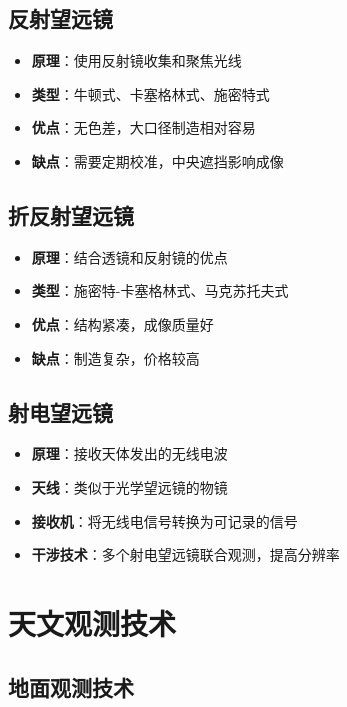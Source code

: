 \documentclass[12pt,UTF8]{ctexbook}
\begin{document}
\subsection{反射望远镜}

\begin{itemize}
  \item \textbf{原理}：使用反射镜收集和聚焦光线
  \item \textbf{类型}：牛顿式、卡塞格林式、施密特式
  \item \textbf{优点}：无色差，大口径制造相对容易
  \item \textbf{缺点}：需要定期校准，中央遮挡影响成像
\end{itemize}

\subsection{折反射望远镜}

\begin{itemize}
  \item \textbf{原理}：结合透镜和反射镜的优点
  \item \textbf{类型}：施密特-卡塞格林式、马克苏托夫式
  \item \textbf{优点}：结构紧凑，成像质量好
  \item \textbf{缺点}：制造复杂，价格较高
\end{itemize}

\subsection{射电望远镜}

\begin{itemize}
  \item \textbf{原理}：接收天体发出的无线电波
  \item \textbf{天线}：类似于光学望远镜的物镜
  \item \textbf{接收机}：将无线电信号转换为可记录的信号
  \item \textbf{干涉技术}：多个射电望远镜联合观测，提高分辨率
\end{itemize}

\section{天文观测技术}

\subsection{地面观测技术}
\end{document}
